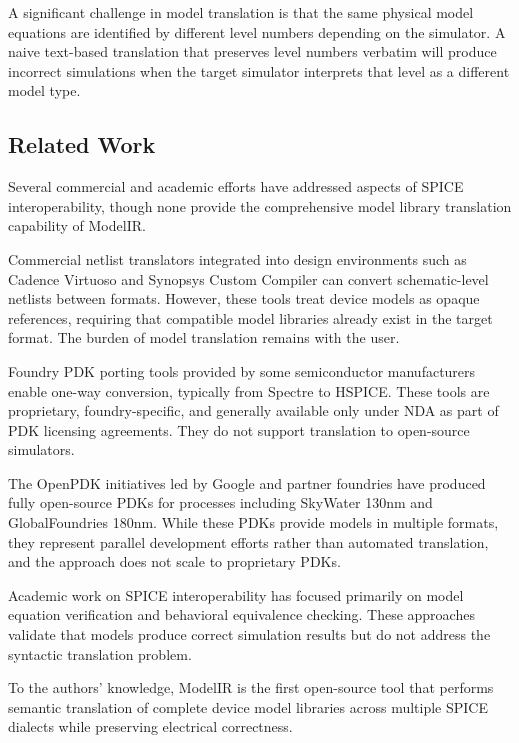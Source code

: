\documentclass[conference]{IEEEtran}
\begin{document}
A significant challenge in model translation is that the same physical model equations are identified by different level numbers depending on the simulator. A naive text-based translation that preserves level numbers verbatim will produce incorrect simulations when the target simulator interprets that level as a different model type.

\subsection{Related Work}

Several commercial and academic efforts have addressed aspects of SPICE interoperability, though none provide the comprehensive model library translation capability of ModelIR.

Commercial netlist translators integrated into design environments such as Cadence Virtuoso and Synopsys Custom Compiler can convert schematic-level netlists between formats. However, these tools treat device models as opaque references, requiring that compatible model libraries already exist in the target format. The burden of model translation remains with the user.

Foundry PDK porting tools provided by some semiconductor manufacturers enable one-way conversion, typically from Spectre to HSPICE. These tools are proprietary, foundry-specific, and generally available only under NDA as part of PDK licensing agreements. They do not support translation to open-source simulators.

The OpenPDK initiatives led by Google and partner foundries have produced fully open-source PDKs for processes including SkyWater 130nm and GlobalFoundries 180nm. While these PDKs provide models in multiple formats, they represent parallel development efforts rather than automated translation, and the approach does not scale to proprietary PDKs.

Academic work on SPICE interoperability has focused primarily on model equation verification and behavioral equivalence checking. These approaches validate that models produce correct simulation results but do not address the syntactic translation problem.

To the authors' knowledge, ModelIR is the first open-source tool that performs semantic translation of complete device model libraries across multiple SPICE dialects while preserving electrical correctness.

\end{document}
